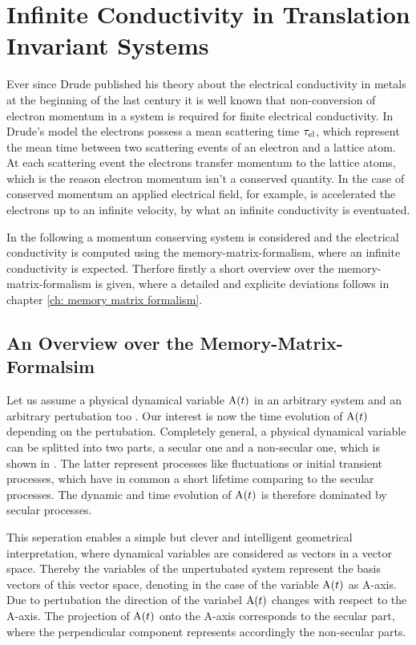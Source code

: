 %
%
%
\chapter{Infinite Conductivity in Translation Invariant Systems}
\label{ch:infinite conductivity}
%
%
%
Ever since Drude published his theory about the electrical conductivity in metals \cite{Drude} at the beginning of the last century it is well known that non-conversion of electron momentum in a system is required for finite electrical conductivity.
In Drude's model the electrons possess a mean scattering time $\tau_{\mathrm{el}}$, which represent the mean time between two scattering events of an electron and a lattice atom.
At each scattering event the electrons transfer momentum to the lattice atoms, which is the reason electron momentum isn't a conserved quantity.
In the case of conserved momentum an applied electrical field, for example, is accelerated the electrons up to an infinite velocity, by what an infinite conductivity is eventuated.

In the following a momentum conserving system is considered and the electrical conductivity is computed using the memory-matrix-formalism, where an infinite conductivity is expected.
Therfore firstly a short overview over the memory-matrix-formalism is given, where a detailed and explicite deviations follows in chapter \ref{ch: memory matrix formalism}.
%
%
\section{An Overview over the Memory-Matrix-Formalsim}
\label{sec:overview MMF}
%
%
Let us assume a physical dynamical variable $\mathrm{A}(t)$ in an arbitrary system and an arbitrary pertubation too	.
Our interest is now the time evolution of $\mathrm{A}(t)$ depending on the pertubation.
Completely general, a physical dynamical variable can be splitted into two parts, a secular one and a non-secular one, which is shown in \cite{Mori}.
The latter represent processes like fluctuations or initial transient processes, which have in common a short lifetime comparing to the secular processes.
The dynamic and time evolution of $\mathrm{A}(t)$ is therefore dominated by secular processes.

This seperation enables a simple but clever and intelligent geometrical interpretation, where dynamical variables are considered as vectors in a vector space.
Thereby the variables of the unpertubated system represent the basis vectors of this vector space, denoting in the case of the variable $\mathrm{A}(t)$ as A-axis.
Due to pertubation the direction of the variabel $\mathrm{A}(t)$ changes with respect to the A-axis.
The projection of $\mathrm{A}(t)$ onto the A-axis corresponds to the secular part, where the perpendicular component represents accordingly the non-secular parts.

